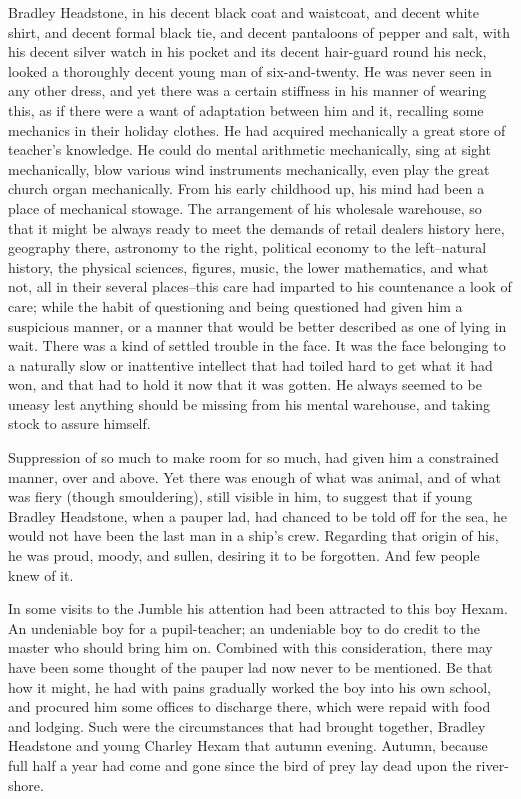 Bradley Headstone, in his decent black coat and waistcoat, and decent
white shirt, and decent formal black tie, and decent pantaloons of
pepper and salt, with his decent silver watch in his pocket and its
decent hair-guard round his neck, looked a thoroughly decent young man
of six-and-twenty. He was never seen in any other dress, and yet there
was a certain stiffness in his manner of wearing this, as if there were
a want of adaptation between him and it, recalling some mechanics in
their holiday clothes. He had acquired mechanically a great store of
teacher’s knowledge. He could do mental arithmetic mechanically, sing
at sight mechanically, blow various wind instruments mechanically, even
play the great church organ mechanically. From his early childhood up,
his mind had been a place of mechanical stowage. The arrangement of
his wholesale warehouse, so that it might be always ready to meet the
demands of retail dealers history here, geography there, astronomy to
the right, political economy to the left--natural history, the physical
sciences, figures, music, the lower mathematics, and what not, all in
their several places--this care had imparted to his countenance a look
of care; while the habit of questioning and being questioned had given
him a suspicious manner, or a manner that would be better described as
one of lying in wait. There was a kind of settled trouble in the face.
It was the face belonging to a naturally slow or inattentive intellect
that had toiled hard to get what it had won, and that had to hold it now
that it was gotten. He always seemed to be uneasy lest anything should
be missing from his mental warehouse, and taking stock to assure
himself.

Suppression of so much to make room for so much, had given him a
constrained manner, over and above. Yet there was enough of what was
animal, and of what was fiery (though smouldering), still visible in
him, to suggest that if young Bradley Headstone, when a pauper lad, had
chanced to be told off for the sea, he would not have been the last man
in a ship’s crew. Regarding that origin of his, he was proud, moody, and
sullen, desiring it to be forgotten. And few people knew of it.

In some visits to the Jumble his attention had been attracted to this
boy Hexam. An undeniable boy for a pupil-teacher; an undeniable boy
to do credit to the master who should bring him on. Combined with this
consideration, there may have been some thought of the pauper lad now
never to be mentioned. Be that how it might, he had with pains gradually
worked the boy into his own school, and procured him some offices to
discharge there, which were repaid with food and lodging. Such were the
circumstances that had brought together, Bradley Headstone and young
Charley Hexam that autumn evening. Autumn, because full half a year had
come and gone since the bird of prey lay dead upon the river-shore.

